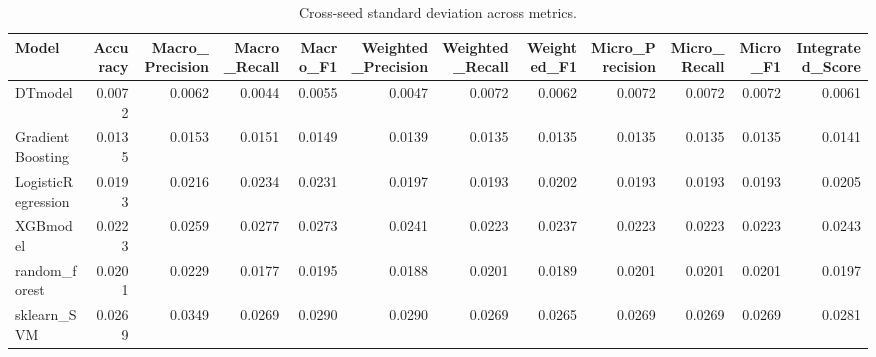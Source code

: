 \begin{table}[t]
\centering
\begin{tabular}{lrrrrrrrrrrr}
\toprule
Model & Accuracy & Macro_Precision & Macro_Recall & Macro_F1 & Weighted_Precision & Weighted_Recall & Weighted_F1 & Micro_Precision & Micro_Recall & Micro_F1 & Integrated_Score \\
\midrule
DTmodel & 0.0072 & 0.0062 & 0.0044 & 0.0055 & 0.0047 & 0.0072 & 0.0062 & 0.0072 & 0.0072 & 0.0072 & 0.0061 \\
GradientBoosting & 0.0135 & 0.0153 & 0.0151 & 0.0149 & 0.0139 & 0.0135 & 0.0135 & 0.0135 & 0.0135 & 0.0135 & 0.0141 \\
LogisticRegression & 0.0193 & 0.0216 & 0.0234 & 0.0231 & 0.0197 & 0.0193 & 0.0202 & 0.0193 & 0.0193 & 0.0193 & 0.0205 \\
XGBmodel & 0.0223 & 0.0259 & 0.0277 & 0.0273 & 0.0241 & 0.0223 & 0.0237 & 0.0223 & 0.0223 & 0.0223 & 0.0243 \\
random_forest & 0.0201 & 0.0229 & 0.0177 & 0.0195 & 0.0188 & 0.0201 & 0.0189 & 0.0201 & 0.0201 & 0.0201 & 0.0197 \\
sklearn_SVM & 0.0269 & 0.0349 & 0.0269 & 0.0290 & 0.0290 & 0.0269 & 0.0265 & 0.0269 & 0.0269 & 0.0269 & 0.0281 \\
\bottomrule
\end{tabular}
\caption{Cross-seed standard deviation across metrics.}
\label{tab:cross_seed_std}
\end{table}
